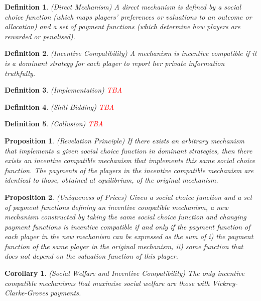 \documentclass{article}
\newtheorem{proposition}{Proposition}
\newtheorem{definition}{Definition}
\newtheorem{corollary}{Corollary}
\begin{document}
\begin{definition}
(Direct Mechanism) A direct mechanism is defined by a social choice function (which maps players' preferences or valuations to an outcome or allocation) and a set of payment functions (which determine how players are rewarded or penalised).
\end{definition}

\begin{definition}
(Incentive Compatibility) A mechanism is incentive compatible if it is a dominant strategy for each player to report her private information truthfully.
\end{definition}

\begin{definition}
(Implementation) \textcolor{red}{TBA}
\end{definition}

\begin{definition}
(Shill Bidding) \textcolor{red}{TBA}
\end{definition}

\begin{definition}
(Collusion) \textcolor{red}{TBA}
\end{definition}

\begin{proposition}
(Revelation Principle) If there exists an arbitrary mechanism that implements a given social choice function in dominant strategies, then there exists an incentive compatible mechanism that implements this same social choice function. The payments of the players in the incentive compatible mechanism are identical to those, obtained at equilibrium, of the original mechanism.
\end{proposition}

\begin{proposition}
(Uniqueness of Prices) Given a social choice function and a set of payment functions defining an incentive compatible mechanism, a new mechanism constructed by taking the same social choice function and changing payment functions is incentive compatible if and only if the payment function of each player in the new mechanism can be expressed as the sum of i) the payment function of the same player in the original mechanism, ii) some function that does not depend on the valuation function of this player.
\end{proposition}

\begin{corollary}
(Social Welfare and Incentive Compatibility) The only incentive compatible mechanisms that maximise social welfare are those with Vickrey-Clarke-Groves payments.
\end{corollary}
\end{document}
